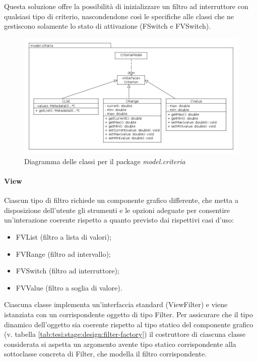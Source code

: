 Questa soluzione offre la possibilità di inizializzare un filtro ad interruttore con qualsiasi tipo di criterio, nascondendone così le specifiche alle classi che ne gestiscono solamente lo stato di attivazione (\textsf{FSwitch} e \textsf{FVSwitch}).
	
\begin{figure}[ht]
\begin{center}
	\includegraphics[width=12cm]{img/model_criteria.png}
	\caption{Diagramma delle classi per il package \textit{model.criteria}}
	\label{fig:tesi:stage:design:model-criteria-classi}
\end{center}
\end{figure}

\paragraph{View}
	Ciascun tipo di filtro richiede un componente grafico differente, che metta a disposizione dell'utente gli strumenti e le opzioni adeguate per consentire un'interazione coerente rispetto a quanto previsto dai rispettivi casi d'uso:
	\begin{itemize}
	  \item \textsf{FVList} (filtro a lista di valori);
	  \item \textsf{FVRange} (filtro ad intervallo);
	  \item \textsf{FVSwitch} (filtro ad interruttore);
	  \item \textsf{FVValue} (filtro a soglia di valore).
	\end{itemize}
Ciascuna classe implementa un'interfaccia standard (\textsf{ViewFilter}) e viene istanziata con un corrispondente oggetto di tipo \textsf{Filter}. Per assicurare che il tipo dinamico dell'oggetto sia coerente rispetto al tipo statico del componente grafico (v. tabella \ref{tab:tesi:stage:design:filter-factory}) il costruttore di ciascuna classe considerata si aspetta un argomento avente tipo statico corrispondente alla sottoclasse concreta di \textsf{Filter}, che modella il filtro corrispondente.

